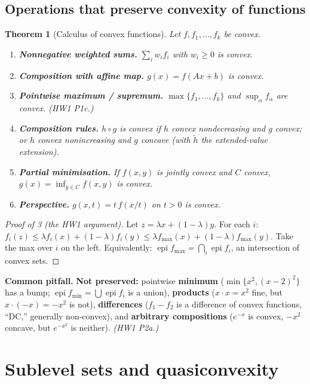 \documentclass[11pt]{article}
\newenvironment{pitfall}{\colorlet{shadecolor}{warncolor}\begin{shaded}\noindent\textbf{Common pitfall.} }{\end{shaded}}
\newcommand{\lam}{\lambda}
\newcommand{\epi}{\operatorname{epi}}
\theoremstyle{definition}
\theoremstyle{plain}
\newtheorem{theorem}[definition]{Theorem}
\theoremstyle{remark}
\begin{document}
\subsection{Operations that preserve convexity of functions}
\begin{theorem}[Calculus of convex functions]
Let $f,f_1,\dots,f_k$ be convex.
\begin{enumerate}
\item \textbf{Nonnegative weighted sums.} $\sum_iw_if_i$ with $w_i\ge0$ is convex.
\item \textbf{Composition with affine map.} $g(x)=f(Ax+b)$ is convex.
\item \textbf{Pointwise maximum / supremum.} $\max\{f_1,\dots,f_k\}$ and $\sup_{\alpha}f_\alpha$ are convex. \emph{(HW1 P1c.)}
\item \textbf{Composition rules.} $h\circ g$ is convex if $h$ convex nondecreasing and $g$ convex; or $h$ convex nonincreasing and $g$ concave (with $\tilde h$ the extended-value extension).
\item \textbf{Partial minimisation.} If $f(x,y)$ is jointly convex and $C$ convex, $g(x)=\inf_{y\in C}f(x,y)$ is convex.
\item \textbf{Perspective.} $g(x,t)=t\,f(x/t)$ on $t>0$ is convex.
\end{enumerate}
\end{theorem}

\begin{proof}[Proof of 3 (the HW1 argument)]
Let $z=\lam x+(1-\lam)y$. For each $i$: $f_i(z)\le\lam f_i(x)+(1-\lam)f_i(y)\le\lam f_{\max}(x)+(1-\lam)f_{\max}(y)$. Take the max over $i$ on the left.
Equivalently: $\epi f_{\max}=\bigcap_i\epi f_i$, an intersection of convex sets.
\end{proof}

\begin{pitfall}
\textbf{Not preserved:} pointwise \textbf{minimum} ($\min\{x^2,(x-2)^2\}$ has a bump; $\epi f_{\min}=\bigcup\epi f_i$ is a union), \textbf{products} ($x\cdot x=x^2$ fine, but $x\cdot(-x)=-x^2$ is not), \textbf{differences} ($f_1-f_2$ is a difference of convex functions, ``DC,'' generally non-convex), and \textbf{arbitrary compositions} ($e^{-x}$ is convex, $-x^2$ concave, but $e^{-x^2}$ is neither). \emph{(HW1 P2a.)}
\end{pitfall}

\section{Sublevel sets and quasiconvexity}
\end{document}
